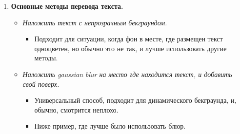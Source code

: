 \documentclass[
a4paper, %
12pt, %
article,
onecolumn, %
openany, %
]{memoir}
\begin{document}
\begin{enumerate}
\item \textbf{Основные методы перевода текста.}

    \begin{itemize}
        \item \emph{Наложить текст с непрозрачным бекграундом.} 

            \begin{itemize}
                \item Подходит для ситуации, когда фон в месте, где размещен текст
            одноцветен, но обычно это не так, и лучше использовать другие методы.
            \end{itemize}

        \item \emph{Наложить gaussian blur на место где находится текст, и добавить
            свой поверх.}

            \begin{itemize}
                \item Универсальный способ, подходит для 
            динамического бекграунда, и, обычно, смотрится неплохо.

                \item Ниже пример, где лучше было использовать блюр.


\end{itemize}
\end{itemize}
\end{enumerate}
\end{document}
